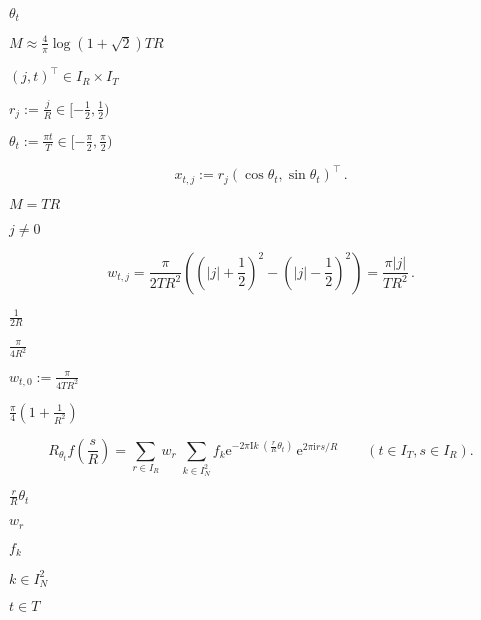 \documentclass{article}
\begin{document}
$\theta_t$
\pagebreak

$M \approx \frac{4}{\pi}\log(1+\sqrt{2}) T R$
\pagebreak

$(j,t)^{\top}\in I_R\times I_T$
\pagebreak

$r_j := \frac{j}{R} \in [-\frac{1}{2},\frac{1}{2})$
\pagebreak

$\theta_t := \frac{\pi t}{T} \in [-\frac{\pi}{2},\frac{\pi}{2})$
\pagebreak

\[ x_{t,j} := r_j\left(\cos\theta_t, \sin\theta_t\right)^{\top}\,. \]
\pagebreak

$M=TR$
\pagebreak

$j \ne 0$
\pagebreak

\[ w_{t,j} = \frac{\pi}{2TR^2}\left(\left(|j|+\frac{1}{2}\right)^2- \left(|j|-\frac{1}{2}\right)^2\right) = \frac{\pi |j| }{TR^2}\, . \]
\pagebreak

$\frac{1}{2R}$
\pagebreak

$\frac{\pi}{4R^2}$
\pagebreak

$w_{t,0} := \frac{\pi}{4TR^2}$
\pagebreak

$\frac{\pi}{4}(1+\frac{1}{R^2})$
\pagebreak

\[ R_{\theta_t} f\left(\frac{s}{R}\right) = \sum_{r \in I_R} w_r \; \sum_{k \in I_N^2} f_{k} \mathrm{e}^{-2\pi\mathrm{I} k \; (\frac{r}{R}\theta_t)} \, \mathrm{e}^{2\pi\mathrm{i} r s / R} \qquad(t \in I_T, s \in I_R). \]
\pagebreak

$\frac{r}{R}\theta_t$
\pagebreak

$w_r$
\pagebreak

$f_k$
\pagebreak

$k \in I_N^2$
\pagebreak

$t \in T$
\pagebreak
\end{document}
